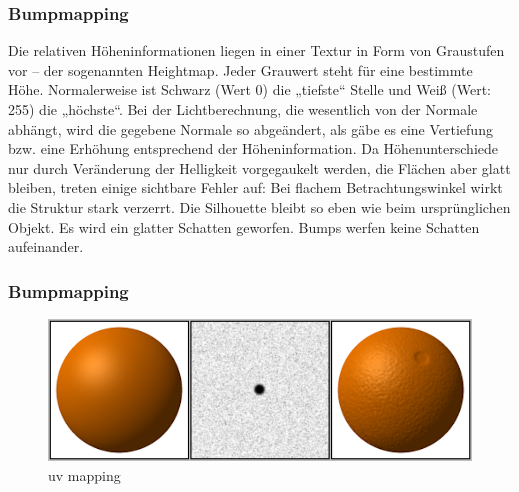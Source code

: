 \subsubsection{Bumpmapping}
Die relativen Höheninformationen liegen in einer Textur in Form von Graustufen vor – der sogenannten Heightmap. Jeder Grauwert steht für eine bestimmte Höhe. Normalerweise ist Schwarz (Wert 0) die „tiefste“ Stelle und Weiß (Wert: 255) die „höchste“.  Bei der Lichtberechnung, die wesentlich von der Normale abhängt, wird die gegebene Normale so abgeändert, als gäbe es eine Vertiefung bzw. eine Erhöhung entsprechend der Höheninformation.  Da Höhenunterschiede nur durch Veränderung der Helligkeit vorgegaukelt werden, die Flächen aber glatt bleiben, treten einige sichtbare Fehler auf:
Bei flachem Betrachtungswinkel wirkt die Struktur stark verzerrt.
Die Silhouette bleibt so eben wie beim ursprünglichen Objekt.
Es wird ein glatter Schatten geworfen.
Bumps werfen keine Schatten aufeinander.
\subsubsection{Bumpmapping}
\begin{figure}[H]
    \centering
    \includegraphics[width=1.0\textwidth]{images/Bumpmap.png}
    \caption{uv mapping} %
    \label{fig:uv-mapping3}
\end{figure}




